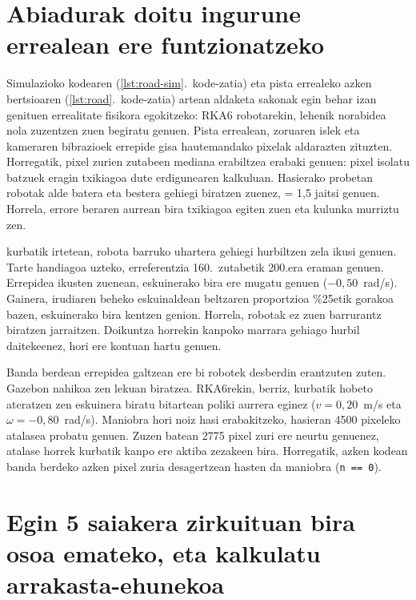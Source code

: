 \section[Abiadurak doitu ingurune errealean ere funtzionatzeko][Ingurune errealeko doikuntzak]{Abiadurak doitu ingurune errealean ere funtzionatzeko}\label{sec:er-doikuntzak}

Simulazioko kodearen (\ref{lst:road-sim}.~kode-zatia) eta pista errealeko azken bertsioaren (\ref{lst:road}.~kode-zatia) artean aldaketa sakonak egin behar izan genituen errealitate fisikora egokitzeko:
RKA6 robotarekin, lehenik norabidea nola zuzentzen zuen begiratu genuen. Pista errealean, zoruaren islek eta kameraren bibrazioek errepide gisa hautemandako pixelak aldarazten zituzten. Horregatik, pixel zurien zutabeen mediana erabiltzea erabaki genuen: pixel isolatu batzuek eragin txikiagoa dute erdigunearen kalkuluan. Hasierako probetan robotak alde batera eta bestera gehiegi biratzen zuenez,  = 1{,}5 jaitsi genuen. Horrela, errore beraren aurrean bira txikiagoa egiten zuen eta kulunka murriztu zen.

kurbatik irtetean, robota barruko uhartera gehiegi hurbiltzen zela ikusi genuen. Tarte handiagoa uzteko, erreferentzia 160.~zutabetik 200.era eraman genuen. Errepidea ikusten zuenean, eskuinerako bira ere mugatu genuen ($-0{,}50$~rad/s). Gainera, irudiaren beheko eskuinaldean beltzaren proportzioa \%25etik gorakoa bazen, eskuinerako bira kentzen genion. Horrela, robotak ez zuen barrurantz biratzen jarraitzen. Doikuntza horrekin kanpoko marrara gehiago hurbil daitekeenez, hori ere kontuan hartu genuen.

Banda berdean errepidea galtzean ere bi robotek desberdin erantzuten zuten. Gazebon nahikoa zen lekuan biratzea. RKA6rekin, berriz, kurbatik hobeto ateratzen zen eskuinera biratu bitartean poliki aurrera eginez ($v = 0{,}20$~m/s eta $\omega = -0{,}80$~rad/s). Maniobra hori noiz hasi erabakitzeko, hasieran 4500 pixeleko atalasea probatu genuen. Zuzen batean 2775 pixel zuri ere neurtu genuenez, atalase horrek kurbatik kanpo ere aktiba zezakeen bira. Horregatik, azken kodean banda berdeko azken pixel zuria desagertzean hasten da maniobra (\texttt{n == 0}).


\section[Egin 5 saiakera zirkuituan bira osoa emateko, eta kalkulatu arrakasta-ehunekoa][5 saiakerak eta arrakasta-tasa]{Egin 5 saiakera zirkuituan bira osoa emateko, eta kalkulatu arrakasta-ehunekoa}\label{sec:er-saiakerak}

